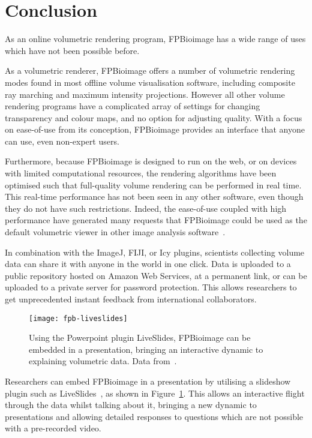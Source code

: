 

\section{Conclusion} %
As an online volumetric rendering program, FPBioimage has a wide range of uses which have not been possible before. 

As a volumetric renderer, FPBioimage offers a number of volumetric rendering modes found in most offline volume visualisation software, including composite ray marching and maximum intensity projections. 
However all other volume rendering programs have a complicated array of settings for changing transparency and colour maps, and no option for adjusting quality.
With a focus on ease-of-use from its conception, FPBioimage provides an interface that anyone can use, even non-expert users. 

Furthermore, because FPBioimage is designed to run on the web, or on devices with limited computational resources, the rendering algorithms have been optimised such that full-quality volume rendering can be performed in real time. 
This real-time performance has not been seen in any other software, even though they do not have such restrictions. 
Indeed, the ease-of-use coupled with high performance have generated many requests that FPBioimage could be used as the default volumetric viewer in other image analysis software~\cite{twitter2018fantm}. 

In combination with the ImageJ, FIJI, or Icy plugins, scientists collecting volume data can share it with anyone in the world in one click. 
Data is uploaded to a public repository hosted on Amazon Web Services, at a permanent link, or can be uploaded to a private server for password protection. 
This allows researchers to get unprecedented instant feedback from international collaborators. 

\begin{figure}[htbp!]
\centering
\texttt{[image: fpb-liveslides]}
\caption[FPBioimage: LiveSlides in Powerpoint brings interactive FPBioimage rendering to presentations]{Using the Powerpoint plugin LiveSlides, FPBioimage can be embedded in a presentation, bringing an interactive dynamic to explaining volumetric data. Data from~\cite{kumar2014dual}. } %
\label{fig:fpb-liveslides}
\end{figure}

Researchers can embed FPBioimage in a presentation by utilising a slideshow plugin such as LiveSlides~\cite{liveslides}, as shown in Figure~\ref{fig:fpb-liveslides}. 
This allows an interactive flight through the data whilst talking about it, bringing a new dynamic to presentations and allowing detailed responses to questions which are not possible with a pre-recorded video. 


